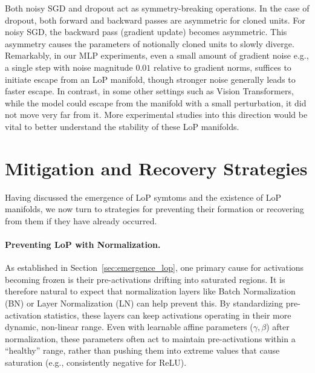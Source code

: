 \documentclass{article}
\newcommand{\ff}[1]{\todo[color=blue!30,size=\tiny]{FF: #1}}
\numberwithin{figure}{section}
\begin{document}

Both noisy SGD and dropout act as symmetry-breaking operations. In the case of dropout, both forward and backward passes are asymmetric for cloned units. For noisy SGD, the backward pass (gradient update) becomes asymmetric. This asymmetry causes the parameters of notionally cloned units to slowly diverge. Remarkably, in our MLP experiments, even a small amount of gradient noise e.g., a single step with noise magnitude $0.01$ relative to gradient norms, suffices to initiate escape from an LoP manifold, though stronger noise generally leads to faster escape. In contrast, in some other settings such as Vision Transformers, while the model could escape from the manifold with a small perturbation, it did not move very far from it. More experimental studies into this direction would be vital to better understand the stability of these LoP manifolds.  


\section{Mitigation and Recovery Strategies}
\label{sec:mitigation_recovery}
\label{sec:mitigate}
Having discussed the emergence of LoP symtoms and the existence of LoP manifolds, we now turn to strategies for preventing their formation or recovering from them if they have already occurred.



\paragraph{Preventing LoP with Normalization.}
As established in Section~\ref{sec:emergence_lop}, one primary cause for activations becoming frozen is their pre-activations drifting into saturated regions. It is therefore natural to expect that normalization layers like Batch Normalization (BN) or Layer Normalization (LN) can help prevent this. By standardizing pre-activation statistics, these layers can keep activations operating in their more dynamic, non-linear range. Even with learnable affine parameters ($\gamma, \beta$) after normalization, these parameters often act to maintain pre-activations within a ``healthy'' range, rather than pushing them into extreme values that cause saturation (e.g., consistently negative for ReLU).
\end{document}
